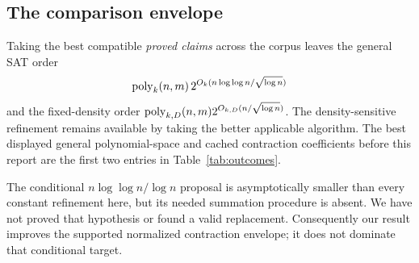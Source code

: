 \subsection{The comparison envelope}

Taking the best compatible \emph{proved claims} across the corpus leaves
the general SAT order
\[
 \operatorname{poly}_k(n,m)\,
 2^{O_k(n\log\log n/\sqrt{\log n})}
\]
and the fixed-density order
$\operatorname{poly}_{k,D}(n,m)2^{O_{k,D}(n/\sqrt{\log n})}$.
The density-sensitive refinement remains available by taking the better
applicable algorithm. The best displayed general polynomial-space and
cached contraction coefficients before this report are the first two
entries in Table~\ref{tab:outcomes}.

The conditional $n\log\log n/\log n$ proposal is asymptotically smaller
than every constant refinement here, but its needed summation procedure
is absent. We have not proved that hypothesis or found a valid replacement.
Consequently our result improves the supported normalized contraction
envelope; it does not dominate that conditional target.
